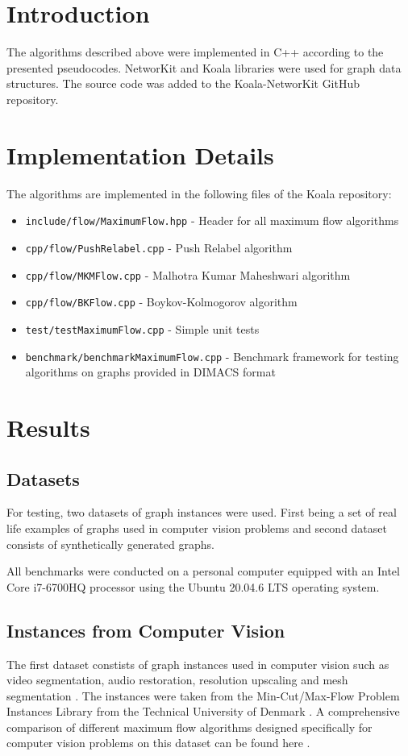 \section{Introduction}
The algorithms described above were implemented in C++ according to the presented pseudocodes. NetworKit and Koala libraries were used for graph data structures. The source code was added to the Koala-NetworKit  GitHub repository.
\section{Implementation Details}
The algorithms are implemented in the following files of the Koala repository:
\begin{itemize}
\item \texttt{include/flow/MaximumFlow.hpp} - Header for all maximum flow algorithms
\item \texttt{cpp/flow/PushRelabel.cpp} - Push Relabel algorithm
\item \texttt{cpp/flow/MKMFlow.cpp} - Malhotra Kumar Maheshwari algorithm
\item \texttt{cpp/flow/BKFlow.cpp} - Boykov-Kolmogorov algorithm
\item \texttt{test/testMaximumFlow.cpp} - Simple unit tests
\item \texttt{benchmark/benchmarkMaximumFlow.cpp} - Benchmark framework for testing algorithms on graphs provided in DIMACS \cite{dimacs} format
\end{itemize}
\section{Results}

\subsection{Datasets}
For testing, two datasets of graph instances were used. First being a set of real life examples of graphs used in computer vision problems and second dataset consists of synthetically generated graphs.

All benchmarks were conducted on a personal computer equipped with an Intel Core i7-6700HQ processor using the Ubuntu 20.04.6 LTS operating system.

\subsection{Instances from Computer Vision}
The first dataset constists of graph instances used in computer vision such as video segmentation, audio restoration, resolution upscaling and mesh segmentation \cite{vision}. The instances were taken from the Min-Cut/Max-Flow Problem Instances Library from the Technical University of Denmark \cite{dataset}. A comprehensive comparison of different maximum flow algorithms designed specifically for computer vision problems on this dataset can be found here \cite{reviewmaxflow}.

